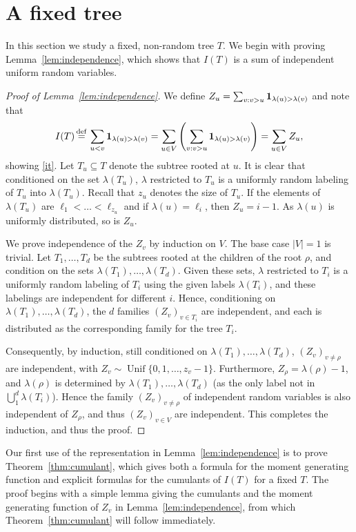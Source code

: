 \documentclass[11pt]{article}
\newcommand{\ind}{{\bf 1}}
\def\l{\lambda}
\numberwithin{theorem}{section}
\theoremstyle{definition}
\newcommand{\eqd}{\,{\buildrel {\mathrm{def}} \over =}\,}
\newcommand{\Unif}{\mathop{\mathrm{Unif}}}
\numberwithin{equation}{section}
\newcommand{\refT}[1]{Theorem~\ref{#1}}
\newcommand{\refL}[1]{Lemma~\ref{#1}}
\begin{document}
\section{A fixed tree}\label{sec:prelude}

In this section we study a fixed, non-random tree $T$.  We begin with proving 
\refL{lem:independence}, which shows that
\(I(T)\) is a sum of independent uniform random variables.

\begin{proof}[Proof of {\refL{lem:independence}}]
We define $Z_u = \sum_{v :  v> u} {\ind}_{\l(u) > \l(v)}$ and note that
\begin{equation}
I(T) \eqd \sum_{u < v} {\ind}_{\l(u) > \l(v)} = \sum_{u\in V} \left(\sum_{v:v > u} {\ind}_{\l(u) > \l(v)}\right) = \sum_{u\in V} Z_u,
\end{equation}
showing \eqref{it}. 
%
Let $T_u\subseteq T$ denote the subtree rooted at $u$. It is clear that 
conditioned on the set $\l(T_u)$,
$\l$ restricted to $T_u$ is a uniformly random labeling of $T_u$ into
$\l(T_u)$.
Recall that \(z_u\) denotes the size of \(T_u\).
If the elements of $\l(T_u)$ are $\ell_1 < \dots < \ell_{z_u}$
and if $\l(u) = \ell_i$, then $Z_u = i-1$. As $\l(u)$ is uniformly distributed,
so is $Z_u$. 

We prove independence of the $Z_v$ by induction on $V$. The base case $|V| = 1$ is trivial.
Let $T_1,\dots,T_d$ be the subtrees rooted at the children of the root
$\rho$, and 
condition on the sets $\l(T_1),\dots,\l(T_d)$.
Given these sets, $\l$ restricted to $T_i$ is a uniformly random labeling
of $T_i$ using the given labels $\l(T_i)$, and these labelings are
independent for different $i$.
Hence, conditioning on $\l(T_1),\dots,\l(T_d)$, the $d$ families
$(Z_v)_{v\in T_i}$ are independent, and each is distributed as the
corresponding family for the tree $T_i$.

Consequently, by induction, still conditioned on $\l(T_1),\dots,\l(T_d)$,
 $(Z_v)_{v\neq\rho}$ are independent, with 
$Z_v \sim \Unif\{0,1,\dots,z_v-1\}$. 
Furthermore, $Z_\rho=\l(\rho)-1$, and $\l(\rho)$ is determined by
$\l(T_1),\dots,\l(T_d)$ (as the only label not in $\bigcup_1^d\l(T_i)$).
Hence the family  $(Z_v)_{v\neq\rho}$ of  independent random variables is
also independent of $Z_\rho$, and thus 
 $(Z_v)_{v\in V}$ are independent.
This completes the induction, and thus the proof.
\end{proof}

Our first use of the representation in \refL{lem:independence} is to prove \refT{thm:cumulant},
which gives both a formula for the moment generating function and explicit formulas for the
cumulants of $I(T)$ for a fixed $T$.  The proof begins with a simple lemma giving the cumulants and
the moment generating function of $Z_v$ in \refL{lem:independence}, from which \refT{thm:cumulant} will
follow immediately.
\end{document}
